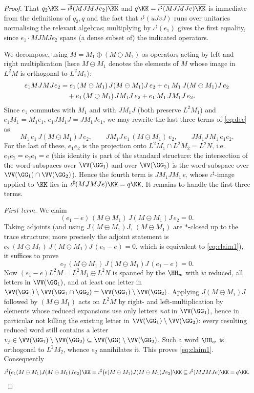 \begin{proof}
That $q_2\KK=\overline{\iota^\sharp(MJMJe_2)\KK}$ and $q\KK=\overline{\iota^\sharp(MJMJe)\KK}$
is immediate from the definitions of $q_2,q$ and the fact that $\iota^\sharp(uJvJ)$ runs over
unitaries normalising the relevant algebras; multiplying by $\iota^\sharp(e_1)$ gives the
first equality, since $e_1\cdot MJMJe_2$ spans (a dense subset of) the indicated operators.

We decompose, using $M=M_1\oplus(M\ominus M_1)$ as operators acting by left and right
multiplication (here $M\ominus M_1$ denotes the elements of $M$ whose image in $L^2M$ is
orthogonal to $L^2M_1$):
\begin{align}
e_1 MJMJ e_2
&= e_1\,(M\ominus M_1)\,J(M\ominus M_1)J\,e_2
 + e_1\,M_1\,J(M\ominus M_1)J\,e_2 \notag\\
&\quad + e_1\,(M\ominus M_1)\,JM_1J\,e_2
 + e_1\,M_1\,JM_1J\,e_2. \label{eq:dec}
\end{align}
Since $e_1$ commutes with $M_1$ and with $JM_1J$ (both preserve $L^2M_1$) and
$e_1 M_1=M_1 e_1$, $e_1 JM_1J=JM_1J e_1$, we may rewrite the last three terms of
\eqref{eq:dec} as
\[
M_1\,e_1\,J(M\ominus M_1)J\,e_2,\qquad
JM_1J\,e_1\,(M\ominus M_1)\,e_2,\qquad
JM_1J\,M_1\,e_1 e_2 .
\]
For the last of these, $e_1 e_2$ is the projection onto $L^2M_1\cap L^2M_2=L^2N$, i.e.
$e_1e_2=e_2e_1=e$ (this identity is part of the standard structure: the intersection of the
word-subspaces over $\VV(\GG_1)$ and over $\VV(\GG_2)$ is the word-subspace over
$\VV(\GG_1)\cap\VV(\GG_2)$). Hence the fourth term is $JM_1J M_1\,e$, whose
$\iota^\sharp$-image applied to $\KK$ lies in $\iota^\sharp(MJMJe)\KK=q\KK$. It remains to
handle the first three terms.

\medskip
\emph{First term.} We claim
\begin{equation}\label{eq:claim1}
(e_1-e)\,(M\ominus M_1)\,J(M\ominus M_1)J\,e_2=0 .
\end{equation}
Taking adjoints (and using $J(M\ominus M_1)J$, $(M\ominus M_1)$ are $*$-closed up to the
trace structure; more precisely the adjoint statement is
$e_2\,(M\ominus M_1)\,J(M\ominus M_1)J\,(e_1-e)=0$, which is equivalent to
\eqref{eq:claim1}), it suffices to prove
\[
e_2\,(M\ominus M_1)\,J(M\ominus M_1)J\,(e_1-e)=0 .
\]
Now $(e_1-e)L^2M=L^2M_1\ominus L^2N$ is spanned by the $\HH_w$ with $w$ reduced, all letters
in $\VV(\GG_1)$, and at least one letter in $\VV(\GG_1)\setminus\VV(\GG_1\cap\GG_2)
=\VV(\GG_1)\setminus\VV(\GG_2)$. Applying $J(M\ominus M_1)J$ followed by $(M\ominus M_1)$
acts on $L^2M$ by right- and left-multiplication by elements whose reduced expansions use
only letters \emph{not} in $\VV(\GG_1)$, hence in particular not killing the existing letter
in $\VV(\GG_1)\setminus\VV(\GG_2)$: every resulting reduced word still contains a letter
$v_j\in\VV(\GG_1)\setminus\VV(\GG_2)\subseteq\VV(\GG)\setminus\VV(\GG_2)$. Such a word
$\HH_w$ is orthogonal to $L^2M_2$, whence $e_2$ annihilates it. This proves
\eqref{eq:claim1}. Consequently
\[
\iota^\sharp\big(e_1(M\ominus M_1)J(M\ominus M_1)Je_2\big)\KK
=\iota^\sharp\big(e(M\ominus M_1)J(M\ominus M_1)Je_2\big)\KK
\subseteq\iota^\sharp(MJMJe)\KK=q\KK .
\]


\end{proof}
